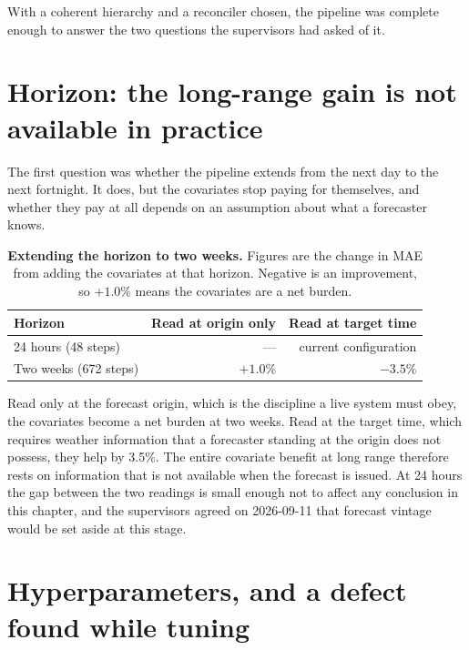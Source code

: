 With a coherent hierarchy and a reconciler chosen, the pipeline was complete enough to
answer the two questions the supervisors had asked of it.

\section{Horizon: the long-range gain is not available in practice}
\label{sec:res-horizon}

The first question was whether the pipeline extends from the next day to the next
fortnight. It does, but the covariates stop paying for themselves, and whether they pay at
all depends on an assumption about what a forecaster knows.

\begin{table}[htp]
\centering
\begin{tabular}{lrr}
\toprule
{\bf Horizon} & {\bf Read at origin only} & {\bf Read at target time} \\
\midrule
24 hours (48 steps) & --- & current configuration \\
Two weeks (672 steps) & $+1.0$\% & $-3.5$\% \\
\bottomrule
\end{tabular}
\caption[Horizon extension]{\textbf{Extending the horizon to two weeks.} Figures are the
change in MAE from adding the covariates at that horizon. Negative is an improvement, so
$+1.0$\% means the covariates are a net burden.}
\label{tab:horizon}
\end{table}

Read only at the forecast origin, which is the discipline a live system must obey, the
covariates become a net burden at two weeks. Read at the target time, which requires weather
information that a forecaster standing at the origin does not possess, they help by 3.5\%.
The entire covariate benefit at long range therefore rests on information that is not
available when the forecast is issued. At 24 hours the gap between the two readings is small
enough not to affect any conclusion in this chapter, and the supervisors agreed on
2026-09-11 that forecast vintage would be set aside at this stage.

\section{Hyperparameters, and a defect found while tuning}
\label{sec:res-tuning}

